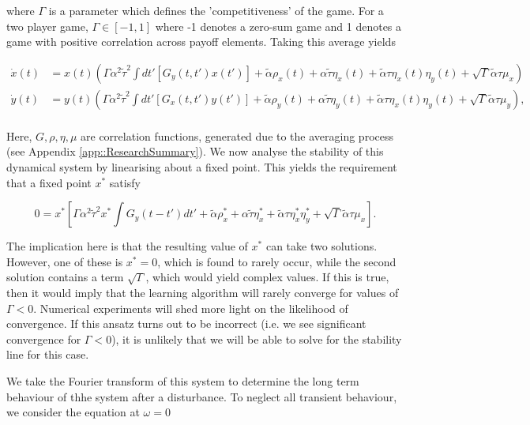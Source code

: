 \documentclass[.../main.tex]{subfiles}
\begin{document}
    where $\Gamma$ is a parameter which defines the 'competitiveness' of the game. For a two player
    game, $\Gamma \in [-1, 1]$ where -1 denotes a zero-sum game and 1 denotes a game with positive
    correlation across payoff elements. Taking this average yields

    \begin{equation}
    \begin{split}
        \dot{x}(t) &= x(t)(\Gamma \alpha^2 \tilde{\tau}^2 \int dt'[G_y(t, t')x(t')] + 
        \tilde{\alpha}
        \rho_x(t) + \alpha \tilde{\tau} \eta_x(t) + \tilde{\alpha} \tau \eta_x(t) \eta_y(t) +
        \sqrt{\Gamma} \tilde{\alpha} \tau \mu_x) \\
        \dot{y}(t) &= y(t)(\Gamma \alpha^2 \tilde{\tau}^2 \int dt'[G_x(t, t')y(t')] + 
        \tilde{\alpha} \rho_y(t) +
        \alpha \tilde{\tau} \eta_y(t) + \tilde{\alpha} \tau \eta_x(t) \eta_y(t)+ 
        \sqrt{\Gamma} \tilde{\alpha} \tau \mu_y), \\
    \end{split}
    \end{equation}

    Here, $G, \rho, \eta, \mu$ are correlation functions, generated due to the averaging process 
    (see Appendix \ref{app::ResearchSummary}). We now analyse the stability of this dynamical system
    by linearising about
    a
    fixed point. This yields the requirement that a fixed point $x^*$ satisfy

    \begin{equation}
    0 = x^* \left[\Gamma \alpha^2 \tilde{\tau}^2 x^* \int G_y(t - t') dt' + \tilde{\alpha} \rho_x^* + \alpha \tilde{\tau} \eta_x^* + \tilde{\alpha} \tau \eta_x^* \eta_y^* + \sqrt{\Gamma} \tilde{\alpha} \tau \mu_x \right].
    \end{equation}

    The implication here is that the resulting value of $x^*$ can take two solutions. However, one of these is $x^* = 0$, which is found to rarely occur, while the second solution contains a term $\sqrt{\Gamma}$, which would yield complex values. If this is true, then it would imply that the learning algorithm will rarely converge for values of $\Gamma < 0$. Numerical experiments will shed more light on the likelihood of convergence. If this ansatz turns out to be incorrect (i.e. we see significant convergence for $\Gamma < 0$), it is unlikely that we will be able to solve for the stability line for this case.  

    We take the Fourier transform of this system to determine the long term behaviour of thhe system
    after a disturbance. To neglect all transient behaviour, we consider the equation at $\omega =
    0$ 
\end{document}
